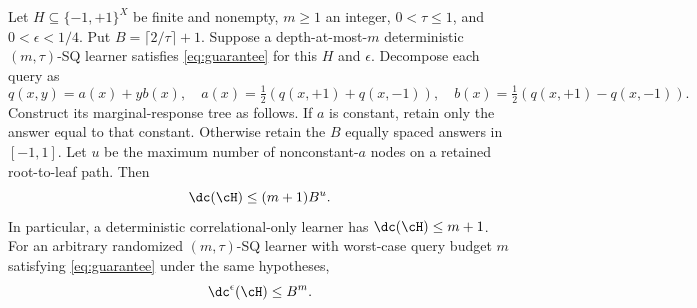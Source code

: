 \begin{theorem}\label{thm:tree}
Let $H\subseteq\{-1,+1\}^X$ be finite and nonempty, $m\ge1$ an integer, $0<\tau\le1$, and $0<\epsilon<1/4$. Put $B=\lceil2/\tau\rceil+1$. Suppose a depth-at-most-$m$ deterministic $(m,\tau)$-SQ learner satisfies \eqref{eq:guarantee} for this $H$ and $\epsilon$. Decompose each query as
\[
 q(x,y)=a(x)+yb(x),\quad
 a(x)=\tfrac12(q(x,+1)+q(x,-1)),\quad
 b(x)=\tfrac12(q(x,+1)-q(x,-1)).
\]
Construct its marginal-response tree as follows. If $a$ is constant, retain only the answer equal to that constant. Otherwise retain the $B$ equally spaced answers in $[-1,1]$. Let $u$ be the maximum number of nonconstant-$a$ nodes on a retained root-to-leaf path. Then
\begin{equation}\label{eq:tree}
 \dc(\cH)\leq(m+1)B^u.
\end{equation}
In particular, a deterministic correlational-only learner has $\dc(\cH)\leq m+1$.
For an arbitrary randomized $(m,\tau)$-SQ learner with worst-case query budget $m$ satisfying \eqref{eq:guarantee} under the same hypotheses,
\begin{equation}\label{eq:approx}
 \dc^{\epsilon}(\cH)\leq B^m.
\end{equation}
\end{theorem}

